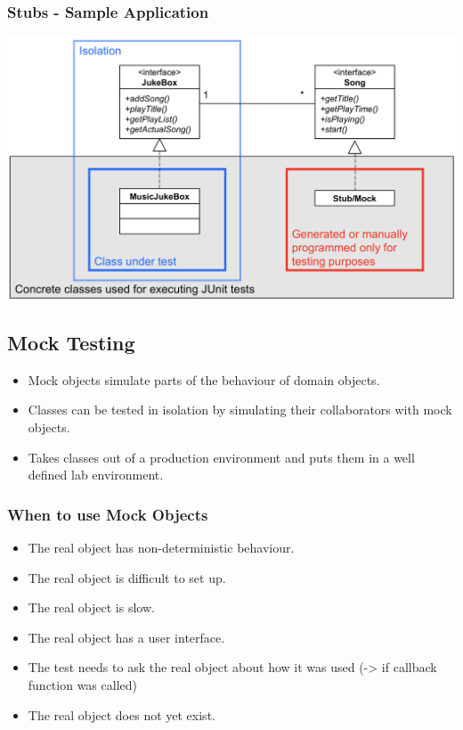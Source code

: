 \documentclass[10pt]{article}
\begin{document}
    \subsubsection{Stubs - Sample Application}
    \begin{center}
    	\includegraphics[scale=0.3]{assets/stubs.png}
    \end{center}
       
    \subsection{Mock Testing}
    \begin{itemize}
    	\item Mock objects simulate parts of the behaviour of domain objects.
    	\item Classes can be tested in isolation by simulating their collaborators with mock objects.
    	\item Takes classes out of a production environment and puts them in a well defined lab environment.
    \end{itemize}
    
    \subsubsection{When to use Mock Objects}
    \begin{itemize}
    	\item The real object has non-deterministic behaviour.
    	\item The real object is difficult to set up.
    	\item The real object is slow.
    	\item The real object has a user interface.
    	\item The test needs to ask the real object about how it was used (-> if callback function was called)
    	\item The real object does not yet exist.
    \end{itemize}
    
\end{document}

